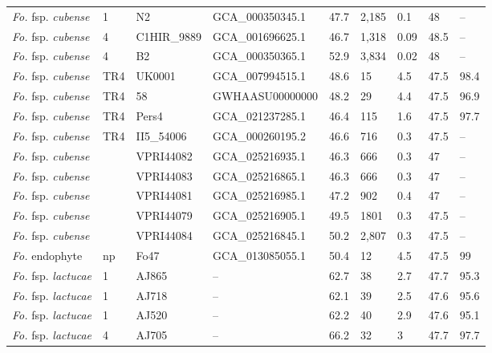 \begin{ThreePartTable}
\begin{longtable}[c]{@{}C{2.5cm}C{0.8cm}C{2cm}C{2.8cm}C{1cm}C{1cm}C{1.5cm}C{0.7cm}C{2.5cm}@{}}
\textit{Fo.} fsp. \textit{cubense}      & 1   & N2           & GCA\_000350345.1 & 47.7 & 2,185 & 0.1  & 48   &--    \\
\textit{Fo.} fsp. \textit{cubense}      & 4   & C1HIR\_9889  & GCA\_001696625.1 & 46.7 & 1,318 & 0.09 & 48.5 &--    \\
\textit{Fo.} fsp. \textit{cubense}      & 4   & B2           & GCA\_000350365.1 & 52.9 & 3,834 & 0.02 & 48   &--    \\
\textit{Fo.} fsp. \textit{cubense}      & TR4 & UK0001       & GCA\_007994515.1 & 48.6 & 15    & 4.5  & 47.5 & 98.4 \\
\textit{Fo.} fsp. \textit{cubense}      & TR4 & 58           & GWHAASU00000000  & 48.2 & 29    & 4.4  & 47.5 & 96.9 \\
\textit{Fo.} fsp. \textit{cubense}      & TR4 & Pers4        & GCA\_021237285.1 & 46.4 & 115   & 1.6  & 47.5 & 97.7 \\
\textit{Fo.} fsp. \textit{cubense}      & TR4 & II5\_54006   & GCA\_000260195.2 & 46.6 & 716   & 0.3  & 47.5 &--    \\
\textit{Fo.} fsp. \textit{cubense}      &     & VPRI44082    & GCA\_025216935.1 & 46.3 & 666   & 0.3  & 47   &--    \\
\textit{Fo.} fsp. \textit{cubense}      &     & VPRI44083    & GCA\_025216865.1 & 46.3 & 666   & 0.3  & 47   &--    \\
\textit{Fo.} fsp. \textit{cubense}      &     & VPRI44081    & GCA\_025216985.1 & 47.2 & 902   & 0.4  & 47   &--    \\
\textit{Fo.} fsp. \textit{cubense}      &     & VPRI44079    & GCA\_025216905.1 & 49.5 & 1801  & 0.3  & 47.5 &--    \\
\textit{Fo.} fsp. \textit{cubense}      &     & VPRI44084    & GCA\_025216845.1 & 50.2 & 2,807 & 0.3  & 47.5 &--    \\
\textit{Fo.} endophyte         & np  & Fo47         & GCA\_013085055.1 & 50.4 & 12    & 4.5  & 47.5 & 99   \\
\textit{Fo.} fsp. \textit{lactucae}     & 1   & AJ865        &--             & 62.7 & 38    & 2.7  & 47.7 & 95.3 \\
\textit{Fo.} fsp. \textit{lactucae}     & 1   & AJ718        &--             & 62.1 & 39    & 2.5  & 47.6 & 95.6 \\
\textit{Fo.} fsp. \textit{lactucae}     & 1   & AJ520        &--             & 62.2 & 40    & 2.9  & 47.6 & 95.1 \\
\textit{Fo.} fsp. \textit{lactucae}     & 4   & AJ705        &--             & 66.2 & 32    & 3    & 47.7 & 97.7 \\

\end{longtable}
\end{ThreePartTable}
